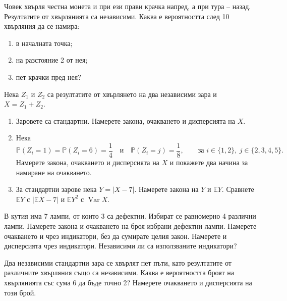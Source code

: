 \documentclass[11pt,a4paper]{article}
\newenvironment{enumeratea}{\begin{enumerate}[label=(\alph*),itemsep=0.28em,topsep=0.25em]}{\end{enumerate}}
\newcommand{\Pbb}{\mathbb P}
\newcommand{\Ebb}{\mathbb E}
\newcommand{\Var}{\operatorname{Var}}
\newcounter{problem}[section]
\begin{document}
\begin{problembook}
Човек хвърля честна монета и при ези прави крачка напред, а при тура --
назад. Резултатите от хвърлянията са независими. Каква е вероятността след
10 хвърляния да се намира:
\begin{enumeratea}
  \item в началната точка;
  \item на разстояние 2 от нея;
  \item пет крачки пред нея?
\end{enumeratea}
\end{problembook}

\begin{problembook}
Нека $Z_1$ и $Z_2$ са резултатите от хвърлянето на два независими зара и
$X=Z_1+Z_2$.
\begin{enumeratea}
  \item Заровете са стандартни. Намерете закона, очакването и дисперсията
  на $X$.
  \item Нека
  \[
  \Pbb(Z_i=1)=\Pbb(Z_i=6)=\frac14
  \quad\text{и}\quad
  \Pbb(Z_i=j)=\frac18,
  \qquad\text{за }i\in\{1,2\},\ j\in\{2,3,4,5\}.
  \]
  Намерете закона, очакването и дисперсията
  на $X$ и покажете два начина за намиране на очакването.
  \item За стандартни зарове нека $Y=|X-7|$. Намерете закона на $Y$ и
  $\Ebb Y$. Сравнете $\Ebb Y$ с $|\Ebb X-7|$ и $\Ebb Y^2$ с $\Var X$.
\end{enumeratea}
\end{problembook}

\begin{problem}
В кутия има 7 лампи, от които 3 са дефектни. Избират се равномерно 4
различни лампи.
Намерете закона и очакването на броя избрани дефектни лампи. Намерете
очакването и чрез индикатори, без да сумирате целия закон. Намерете и
дисперсията чрез индикатори. Независими ли са използваните индикатори?
\end{problem}

\begin{problembook}
Два независими стандартни зара се хвърлят пет пъти, като резултатите от
различните хвърляния също са независими. Каква е вероятността
броят на хвърлянията със сума 6 да бъде точно 2? Намерете очакването и
дисперсията на този брой.
\end{problembook}
\end{document}
